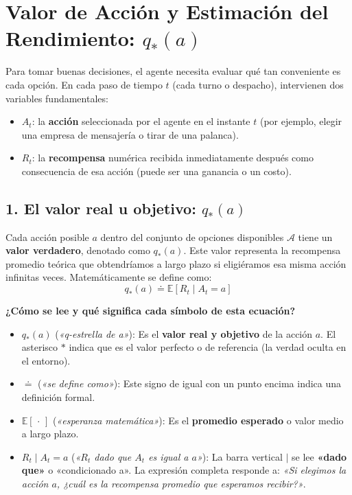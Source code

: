 \section{Valor de Acción y Estimación del Rendimiento: $q_*(a)$}
Para tomar buenas decisiones, el agente necesita evaluar qué tan conveniente es cada opción. En cada paso de tiempo $t$ (cada turno o despacho), intervienen dos variables fundamentales:
\begin{itemize}
  \item $A_t$: la \textbf{acción} seleccionada por el agente en el instante $t$ (por ejemplo, elegir una empresa de mensajería o tirar de una palanca).
  \item $R_t$: la \textbf{recompensa} numérica recibida inmediatamente después como consecuencia de esa acción (puede ser una ganancia o un costo).
\end{itemize}

\subsection*{1. El valor real u objetivo: $q_*(a)$}
Cada acción posible $a$ dentro del conjunto de opciones disponibles $\mathcal{A}$ tiene un \textbf{valor verdadero}, denotado como $q_*(a)$. Este valor representa la recompensa promedio teórica que obtendríamos a largo plazo si eligiéramos esa misma acción infinitas veces. Matemáticamente se define como:
\begin{equation}
  q_*(a) \doteq \mathbb{E}\left[ R_t \mid A_t = a \right]
\end{equation}

\noindent \textbf{¿Cómo se lee y qué significa cada símbolo de esta ecuación?}
\begin{itemize}
  \item $q_*(a)$ (\textit{«q-estrella de a»}): Es el \textbf{valor real y objetivo} de la acción $a$. El asterisco $*$ indica que es el valor perfecto o de referencia (la verdad oculta en el entorno).
  \item $\doteq$ (\textit{«se define como»}): Este signo de igual con un punto encima indica una definición formal.
  \item $\mathbb{E}[\,\cdot\,]$ (\textit{«esperanza matemática»}): Es el \textbf{promedio esperado} o valor medio a largo plazo.
  \item $R_t \mid A_t = a$ (\textit{«$R_t$ dado que $A_t$ es igual a $a$»}): La barra vertical $\mid$ se lee \textbf{«dado que»} o «condicionado a». La expresión completa responde a: \textit{«Si elegimos la acción $a$, ¿cuál es la recompensa promedio que esperamos recibir?»}.
\end{itemize}

